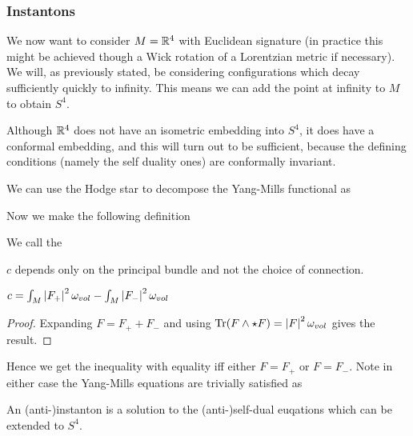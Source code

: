 \documentclass{article}
\begin{document}
\subsubsection{Instantons}

We now want to consider $M=\mathbb{R}^4$ with Euclidean signature (in practice this might be achieved though a Wick rotation of a Lorentzian metric if necessary). We will, as previously stated, be considering configurations which decay sufficiently quickly to infinity. This means we can add the point at infinity to $M$ to obtain $S^4$.

\begin{remark}
	Although $\mathbb{R}^4$ does not have an isometric embedding into $S^4$, it does have a conformal embedding, and this will turn out to be sufficient, because the defining conditions (namely the self duality ones) are conformally invariant.  
\end{remark}
We can use the Hodge star to decompose the Yang-Mills functional as 

Now we make the following definition
\begin{definition}
	We call 
the 
\end{definition}	
	
\begin{prop}
	$c$ depends only on the principal bundle and not the choice of connection. 
\end{prop}
	
\begin{lemma}
	$c = \int_M \left\lvert F_+ \right\rvert^2 \omega_{vol} - \int_M \left\lvert F_- \right\rvert^2 \omega_{vol}$
\end{lemma}
\begin{proof}
Expanding $F = F_+ + F_-$ and using $\operatorname{Tr}(F \wedge \star F) = \left\lvert F \right\rvert^2 \omega_{vol}$ gives the result. 
\end{proof}
	
Hence we get the inequality 
with equality iff either $F= F_+$ or $F=F_-$. Note in either case the Yang-Mills equations are trivially satisfied as 

\begin{definition}
	An (anti-)instanton is a solution to the (anti-)self-dual euqations which can be extended to $S^4$. 
\end{definition}
\end{document}
